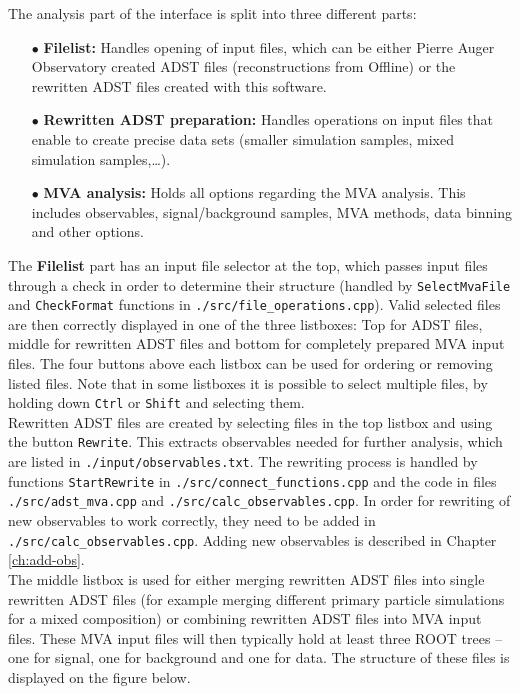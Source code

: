\documentclass[12pt,a4paper]{report}
\begin{document}
{\noindent}The analysis part of the interface is split into three different parts:
\begin{itemize}
\item[$\bullet$] \textbf{Filelist:} Handles opening of input files, which can be either Pierre Auger Observatory created ADST files (reconstructions from Offline) or the rewritten ADST files created with this software.
\item[$\bullet$] \textbf{Rewritten ADST preparation:} Handles operations on input files that enable to create precise data sets (smaller simulation samples, mixed simulation samples,\dots).
\item[$\bullet$] \textbf{MVA analysis:} Holds all options regarding the MVA analysis. This includes observables, signal/background samples, MVA methods, data binning and other options.
\end{itemize}
The \textbf{Filelist} part has an input file selector at the top, which passes input files through a check in order to determine their structure (handled by \texttt{SelectMvaFile} and \texttt{CheckFormat} functions in \texttt{./src/file\_operations.cpp}). Valid selected files are then correctly displayed in one of the three listboxes: Top for ADST files, middle for rewritten ADST files and bottom for completely prepared MVA input files. The four buttons above each listbox can be used for ordering or removing listed files. Note that in some listboxes it is possible to select multiple files, by holding down \texttt{Ctrl} or \texttt{Shift} and selecting them.\\
Rewritten ADST files are created by selecting files in the top listbox and using the button \texttt{Rewrite}. This extracts observables needed for further analysis, which are listed in \texttt{./input/observables.txt}. The rewriting process is handled by functions \texttt{StartRewrite} in \texttt{./src/connect\_functions.cpp} and the code in files \texttt{./src/adst\_mva.cpp} and \texttt{./src/calc\_observables.cpp}. In order for rewriting of new observables to work correctly, they need to be added in \linebreak\texttt{./src/calc\_observables.cpp}. Adding new observables is described in Chapter \ref{ch:add-obs}.\\
The middle listbox is used for either merging rewritten ADST files into single rewritten ADST files (for example merging different primary particle simulations for a mixed composition) or combining rewritten ADST files into MVA input files. These MVA input files will then typically hold at least three ROOT trees -- one for signal, one for background and one for data. The structure of these files is displayed on the figure below.
\end{document}
